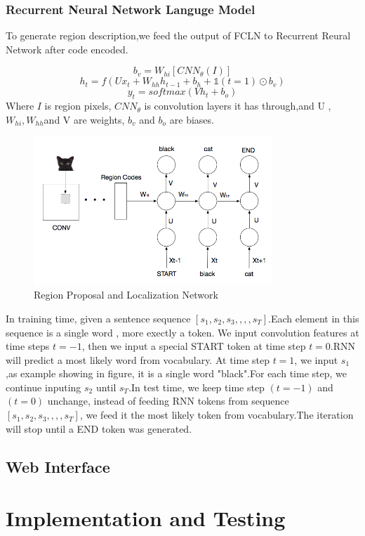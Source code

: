\documentclass[12pt,a4paper]{report}
\begin{document}
\subsubsection{Recurrent Neural Network Languge Model}
To generate region description,we feed the output of FCLN to Recurrent Reural Network after code encoded.

\[b_v=W_{hi}[CNN_\theta(I)]\]
\[h_t=f(Ux_t+W_{hh}h_{t-1}+b_h+ \mathds{1}(t=1)\odot b_v)\] 
\[y_t=softmax(Vh_t+b_o)\]
Where $I$ is region pixels, $CNN_\theta$ is convolution layers it has through,and U ,$W_{hi},W_{hh}$and V are weights, $b_v$ and $b_o$ are biases.
\begin{figure}[h]
\centering
\includegraphics[width=0.8\textwidth]{rnnt.png}
\caption{Region Proposal and Localization Network}
\end{figure}
In training time, given a sentence sequence $[s_1,s_2,s_3, , , ,s_T]$.Each element in this sequence is a single word , more exectly a token. We input convolution features at time steps $t=-1$, then we input a special START token at time step $t=0$.RNN will predict a most likely word from vocabulary. At time step $t=1$, we input $s_1$,as example showing in figure, it is a single word "black".For each time step, we continue inputing $s_2$ until $s_T$.In test time, we keep time step $(t=-1)$ and $(t=0)$ unchange, instead of feeding RNN tokens from sequence  $[s_1,s_2,s_3, , , ,s_T]$, we feed it the most likely token from vocabulary.The iteration will stop until a END token was generated.

\subsection{Web Interface}
\newpage
\section{Implementation and Testing}
\end{document}
